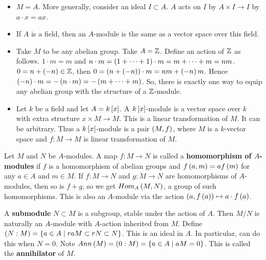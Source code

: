 \begin{example*}
\hfill
\begin{itemize}
\item $ M = A $. More generally, consider an ideal $ I \subset A $. $ A $ acts on $ I $ by $ A \times I \to I $ by $ a \cdot x = ax $.
\item If $ A $ is a field, then an $ A $-module is the same as a vector space over this field.
\item Take $ M $ to be any abelian group. Take $ A = \Z $. Define an action of $ \Z $ as follows. $ 1 \cdot m = m $ and $ n \cdot m = \rb{1 + \dots + 1} \cdot m = m + \dots + m = nm $. $ 0 = n + \rb{- n} \in \Z $, then $ 0 = \rb{n + \rb{-n}} \cdot m = nm + \rb{-n}m $. Hence $ \rb{-n} \cdot m = -\rb{n \cdot m} = -\rb{m + \dots + m} $. So, there is exactly one way to equip any abelian group with the structure of a $ \Z $-module.
\item Let $ k $ be a field and let $ A = k\sb{x} $. A $ k\sb{x} $-module is a vector space over $ k $ with extra structure $ x \times M \to M $. This is a linear transformation of $ M $. It can be arbitrary. Thus a $ k\sb{x} $-module is a pair $ \rb{M, f} $, where $ M $ is a $ k $-vector space and $ f : M \to M $ is linear transformation of $ M $.
\end{itemize}
\end{example*}

\begin{definition}
Let $ M $ and $ N $ be $ A $-modules. A map $ f : M \to N $ is called a \textbf{homomorphism of $ A $-modules} if $ f $ is a homomorphism of abelian groups and $ f\rb{a, m} = af\rb{m} $ for any $ a \in A $ and $ m \in M $. If $ f : M \to N $ and $ g : M \to N $ are homomorphisms of $ A $-modules, then so is $ f + g $, so we get $ Hom_A\rb{M, N} $, a group of such homomorphisms. This is also an $ A $-module via the action $ \rb{a, f\rb{a}} \mapsto a \cdot f\rb{a} $.
\end{definition}

\begin{definition}
A \textbf{submodule} $ N \subset M $ is a subgroup, stable under the action of $ A $. Then $ M / N $ is naturally an $ A $-module with $ A $-action inherited from $ M $. Define $ \rb{N : M} = \cb{a \in A \mid raM \subset rN \subset N} $. This is an ideal in $ A $. In particular, can do this when $ N = 0 $. Note $ Ann\rb{M} = \rb{0 : M} = \cb{a \in A \mid aM = 0} $. This is called the \textbf{annihilator} of $ M $.
\end{definition}

